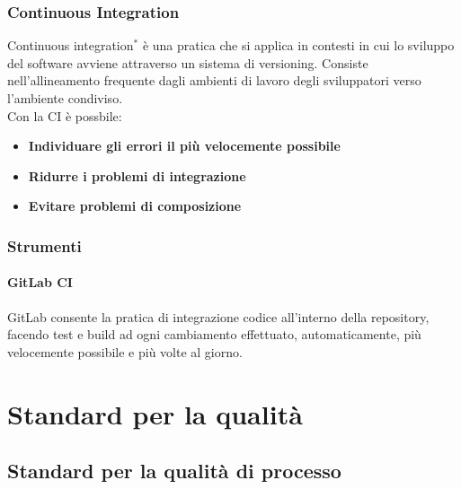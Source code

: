 \documentclass[11pt,a4paper]{article}
\begin{document}
{\subsubsection{Continuous Integration}
Continuous integration$^*$ è una pratica che si applica in contesti in cui lo sviluppo del software avviene attraverso un sistema di versioning. Consiste nell'allineamento frequente dagli ambienti di lavoro degli sviluppatori verso l'ambiente condiviso. \\
Con la CI è possbile:
\begin{itemize}
	\item \textbf{Individuare gli errori il più velocemente possibile}
	\item \textbf{Ridurre i problemi di integrazione}
	\item \textbf{Evitare problemi di composizione} 
\end{itemize}
\subsubsection{Strumenti}
\paragraph{GitLab CI\\}
GitLab consente la pratica di integrazione codice all'interno della repository, facendo test e build ad ogni cambiamento effettuato, automaticamente, più velocemente possibile e più volte al giorno.
\newpage
\appendix
\section{Standard per la qualità}


\subsection{Standard per la qualità di processo}

}
\end{document}
